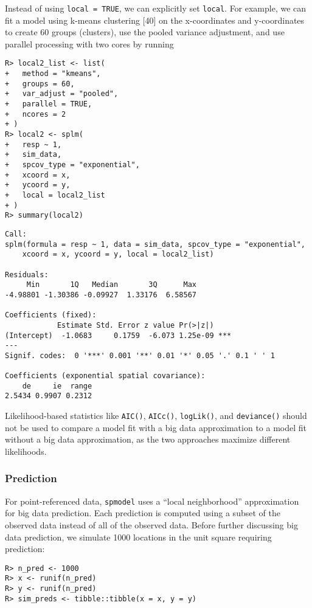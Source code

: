 \documentclass[10pt,letterpaper]{article}
\begin{document}
Instead of using \texttt{local\ =\ TRUE}, we can explicitly set
\texttt{local}. For example, we can fit a model using k-means clustering
{[}40{]} on the x-coordinates and y-coordinates to create 60 groups
(clusters), use the pooled variance adjustment, and use parallel
processing with two cores by running

\begin{verbatim}
R> local2_list <- list(
+   method = "kmeans",
+   groups = 60,
+   var_adjust = "pooled",
+   parallel = TRUE,
+   ncores = 2
+ )
R> local2 <- splm(
+   resp ~ 1,
+   sim_data,
+   spcov_type = "exponential",
+   xcoord = x,
+   ycoord = y,
+   local = local2_list
+ )
R> summary(local2)
\end{verbatim}

\begin{verbatim}
Call:
splm(formula = resp ~ 1, data = sim_data, spcov_type = "exponential", 
    xcoord = x, ycoord = y, local = local2_list)

Residuals:
     Min       1Q   Median       3Q      Max 
-4.98801 -1.30386 -0.09927  1.33176  6.58567 

Coefficients (fixed):
            Estimate Std. Error z value Pr(>|z|)    
(Intercept)  -1.0683     0.1759  -6.073 1.25e-09 ***
---
Signif. codes:  0 '***' 0.001 '**' 0.01 '*' 0.05 '.' 0.1 ' ' 1

Coefficients (exponential spatial covariance):
    de     ie  range 
2.5434 0.9907 0.2312 
\end{verbatim}

Likelihood-based statistics like \texttt{AIC()}, \texttt{AICc()},
\texttt{logLik()}, and \texttt{deviance()} should not be used to compare
a model fit with a big data approximation to a model fit without a big
data approximation, as the two approaches maximize different
likelihoods.

\hypertarget{sec:predict}{%
\subsubsection{Prediction}\label{sec:predict}}

For point-referenced data, \texttt{spmodel} uses a ``local
neighborhood'' approximation for big data prediction. Each prediction is
computed using a subset of the observed data instead of all of the
observed data. Before further discussing big data prediction, we
simulate 1000 locations in the unit square requiring prediction:

\begin{verbatim}
R> n_pred <- 1000
R> x <- runif(n_pred)
R> y <- runif(n_pred)
R> sim_preds <- tibble::tibble(x = x, y = y)
\end{verbatim}
\end{document}
